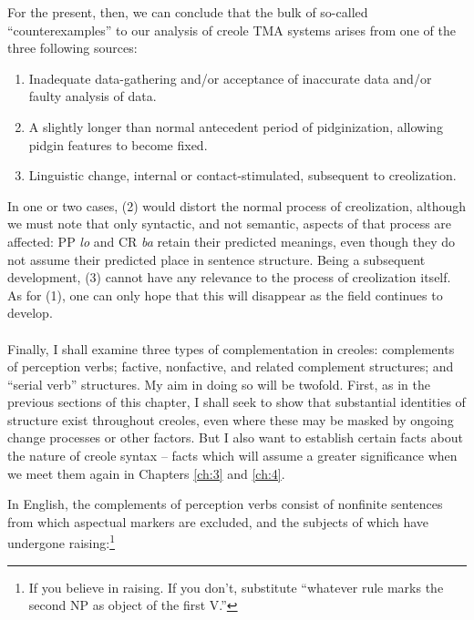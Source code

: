 For the present, then, we can conclude that the bulk of so-called ``counterexamples'' to our analysis of creole TMA systems arises from one of the three following sources:

\begin{enumerate}
\item Inadequate data-gathering and/or acceptance of inaccurate data and/or faulty analysis of data.
\item A slightly longer than normal antecedent period of pidginization, allowing pidgin features to become fixed.
\item Linguistic change, internal or contact-stimulated, subsequent to creolization.
\end{enumerate}
In one or two cases, (2) would distort the normal process of creolization, although we must note that only syntactic, and not semantic, aspects of that process are affected: PP \textit{lo} and CR \textit{ba} retain their predicted meanings, even though they do not assume their predicted place in sentence structure. Being a subsequent development, (3) cannot have any relevance to the process of creolization itself. As for (1), one can only hope that this will disappear as the field continues to develop.\\\\

Finally, I shall examine three types of complementation in creoles: complements of perception verbs; factive, nonfactive, and related complement structures; and ``serial verb'' structures. My aim in doing so will be twofold. First, as in the previous sections of this chapter, I shall seek to show that substantial identities of structure exist throughout creoles, even where these may be masked by ongoing change processes or other factors. But I also want to establish certain facts about the nature of creole syntax -- facts which will assume a greater significance when we meet them again in Chapters \ref{ch:3} and \ref{ch:4}.

In English, the complements of perception verbs consist of nonfinite sentences from which aspectual markers are excluded, and the subjects of which have undergone raising:\footnote{If you believe in raising. If you don't, substitute ``whatever rule marks the second NP as object of the first V.''}

\z

\z

